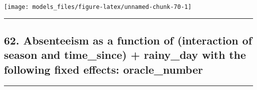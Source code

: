 \documentclass[]{article}
\begin{document}
\begin{center}\texttt{[image: models\_files/figure-latex/unnamed-chunk-70-1]} \end{center}

\newpage

\begin{center}\rule{0.5\linewidth}{\linethickness}\end{center}

\subsection{62. Absenteeism as a function of (interaction of season and
time\_since) + rainy\_day with the following fixed effects:
oracle\_number}\label{absenteeism-as-a-function-of-interaction-of-season-and-time_since-rainy_day-with-the-following-fixed-effects-oracle_number-1}

\begin{center}\rule{0.5\linewidth}{\linethickness}\end{center}
\end{document}
